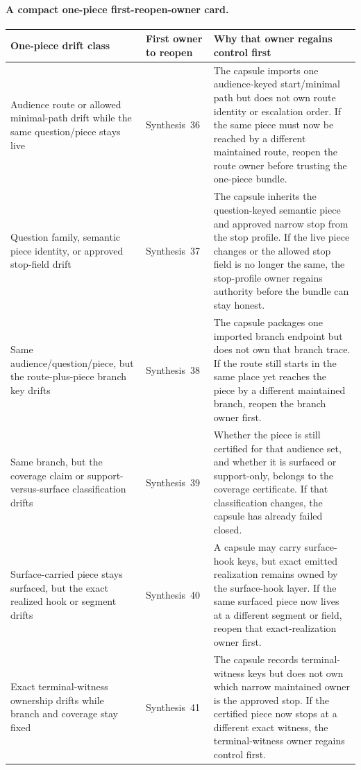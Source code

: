 \documentclass[11pt]{article}
\begin{document}
\paragraph{A compact one-piece first-reopen-owner card.}
\begin{table}[t]
\centering
\small
\begin{tabularx}{\linewidth}{@{}Y Y Y@{}}
\toprule
One-piece drift class & First owner to reopen & Why that owner regains control first \\
\midrule
Audience route or allowed minimal-path drift while the same question/piece stays live & Synthesis~36 & The capsule imports one audience-keyed start/minimal path but does not own route identity or escalation order. If the same piece must now be reached by a different maintained route, reopen the route owner before trusting the one-piece bundle. \\
Question family, semantic piece identity, or approved stop-field drift & Synthesis~37 & The capsule inherits the question-keyed semantic piece and approved narrow stop from the stop profile. If the live piece changes or the allowed stop field is no longer the same, the stop-profile owner regains authority before the bundle can stay honest. \\
Same audience/question/piece, but the route-plus-piece branch key drifts & Synthesis~38 & The capsule packages one imported branch endpoint but does not own that branch trace. If the route still starts in the same place yet reaches the piece by a different maintained branch, reopen the branch owner first. \\
Same branch, but the coverage claim or support-versus-surface classification drifts & Synthesis~39 & Whether the piece is still certified for that audience set, and whether it is surfaced or support-only, belongs to the coverage certificate. If that classification changes, the capsule has already failed closed. \\
Surface-carried piece stays surfaced, but the exact realized hook or segment drifts & Synthesis~40 & A capsule may carry surface-hook keys, but exact emitted realization remains owned by the surface-hook layer. If the same surfaced piece now lives at a different segment or field, reopen that exact-realization owner first. \\
Exact terminal-witness ownership drifts while branch and coverage stay fixed & Synthesis~41 & The capsule records terminal-witness keys but does not own which narrow maintained owner is the approved stop. If the certified piece now stops at a different exact witness, the terminal-witness owner regains control first. \\

\end{tabularx}
\end{table}
\end{document}
